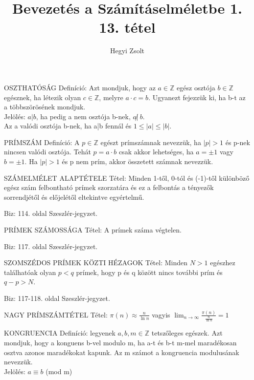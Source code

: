 \documentclass[]{article}
\title{Bevezetés a Számításelméletbe 1.\\{\large 13. tétel}}
\author{Hegyi Zsolt}
\begin{document}
\maketitle{}
\begin{shaded}
OSZTHATÓSÁG Definíció: Azt mondjuk, hogy az $a \in \mathbb{Z}$ egész osztója $b \in \mathbb{Z}$ egésznek, ha létezik olyan $c \in \mathbb{Z}$, melyre $a \cdot c = b$. Ugyanezt fejezzük ki, ha b-t az a többszörösének mondjuk. \\
Jelölés: $a|b$, ha pedig a nem osztója b-nek, $a\!\not|\ b$.\\Az a valódi osztója b-nek, ha a|b fennál és $1 \leq |a| \leq |b|$.
\end{shaded}
\begin{shaded}
PRÍMSZÁM Definíció: A $p \in \mathbb{Z}$ egészt prímszámnak nevezzük, ha $|p| > 1$ és p-nek nincsen valódi osztója. Tehát $p = a \cdot b$ csak akkor lehetséges, ha $a = \pm 1$ vagy $b = \pm 1$. Ha $|p| > 1$ és p nem prím, akkor összetett számnak nevezzük.
\end{shaded}
\begin{framed}
SZÁMELMÉLET ALAPTÉTELE Tétel: Minden 1-től, 0-tól és (-1)-től különböző egész szám felbontható prímek szorzatára és ez a felbontás a tényezők sorrendjétől és előjelétől eltekintve egyértelmű.
\end{framed}
\begin{leftbar}
Biz: 114. oldal Szeszlér-jegyzet.
\end{leftbar}
\begin{framed}
PRÍMEK SZÁMOSSÁGA Tétel: A prímek száma végtelen.
\end{framed}
\begin{leftbar}
Biz: 117. oldal Szeszlér-jegyzet.
\end{leftbar}
\begin{framed}
SZOMSZÉDOS PRÍMEK KÖZTI HÉZAGOK Tétel: Minden $N > 1$ egészhez találhatóak olyan $p < q$ prímek, hogy p és q között nincs további prím és $q-p>N$.
\end{framed}
\begin{leftbar}
Biz: 117-118. oldal Szeszlér-jegyzet.
\end{leftbar}
\begin{framed}
NAGY PRÍMSZÁMTÉTEL Tétel: $\pi(n) \approx \frac{n}{\ln{n}}$ vagyis $\lim_{n\to\infty} \frac{\pi(n)}{\frac{n}{\ln{n}}} = 1$
\end{framed}
\begin{shaded}
KONGRUENCIA Definíció: legyenek $a,b,m\in\mathbb{Z}$ tetszőleges egészek. Azt mondjuk, hogy a konguens b-vel modulo m, ha a-t és b-t m-mel maradékosan osztva azonos maradékokat kapunk. Az m számot a kongruencia modulusának nevezzük. \\
Jelölés: $a \equiv b$ (mod m)

\end{shaded}
\end{document}
